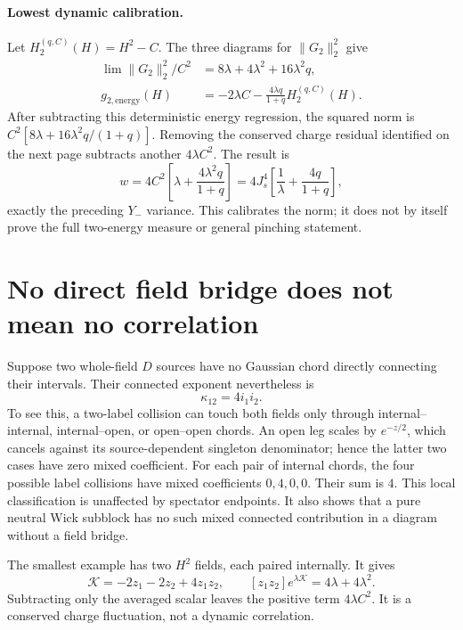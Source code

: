 \documentclass[11pt]{article}
\begin{document}
\paragraph{Lowest dynamic calibration.}
Let $H_2^{(q,C)}(H)=H^2-C$. The three diagrams for $\|G_2\|_2^2$
give
\begin{align}
 \lim\|G_2\|_2^2/C^2&=8\lambda+4\lambda^2+16\lambda^2q,\\
 g_{2,\mathrm{energy}}(H)&=-2\lambda C
               -\frac{4\lambda q}{1+q}H_2^{(q,C)}(H).
\end{align}
After subtracting this deterministic energy regression, the squared
norm is $C^2[8\lambda+16\lambda^2q/(1+q)]$. Removing the conserved
charge residual identified on the next page subtracts another
$4\lambda C^2$. The result is
\begin{equation}
 w=4C^2\left[\lambda+\frac{4\lambda^2q}{1+q}\right]
   =4J_s^4\left[\frac1\lambda+\frac{4q}{1+q}\right],
\end{equation}
exactly the preceding $Y_-$ variance. This calibrates the norm; it
does not by itself prove the full two-energy measure or general
pinching statement.

\newpage
\section{No direct field bridge does not mean no correlation}
Suppose two whole-field $D$ sources have no Gaussian chord directly
connecting their intervals. Their connected exponent nevertheless is
\begin{equation}
 \boxed{\ \kappa_{12}=4i_1i_2.\ }\label{eq:b0}
\end{equation}
To see this, a two-label collision can touch both fields only through
internal--internal, internal--open, or open--open chords. An open
leg scales by $e^{-z/2}$, which cancels against its source-dependent
singleton denominator; hence the latter two cases have zero mixed
coefficient. For each pair of internal chords, the four possible
label collisions have mixed coefficients $0,4,0,0$. Their sum is $4$.
This local classification is unaffected by spectator endpoints.
It also shows that a pure neutral Wick subblock has no such mixed
connected contribution in a diagram without a field bridge.

The smallest example has two $H^2$ fields, each paired internally.
It gives
\begin{equation}
 \mathcal K=-2z_1-2z_2+4z_1z_2,
 \qquad [z_1z_2]e^{\lambda\mathcal K}=4\lambda+4\lambda^2.
 \label{eq:counterexample}
\end{equation}
Subtracting only the averaged scalar leaves the positive term
$4\lambda C^2$. It is a conserved charge fluctuation, not a dynamic
correlation.
\end{document}
